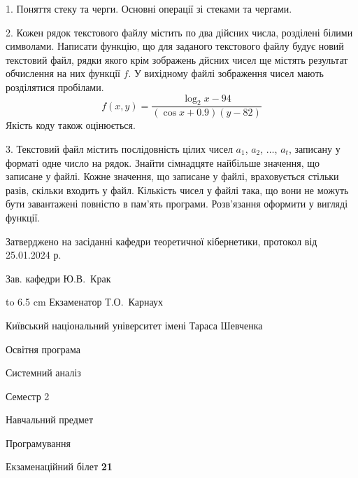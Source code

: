 \documentclass[12pt, ukrainian]{article}
\begin{document}
{%
1. Поняття стеку та черги. Основні операції зі стеками та чергами.%
\par
\vspace{2mm}

2. Кожен рядок текстового файлу містить по два дійсних числа, розділені білими символами.
Написати функцію, що для заданого текстового файлу будує новий текстовий файл, рядки якого крім зображень дйсних чисел ще містять результат обчислення на них функції $f$. У вихідному файлі зображення чисел мають розділятися пробілами. 
$$f(x, y) =\frac{\log_{2} x - 94}{(\cos x + 0.9) (y - 82)}$$ 
Якість коду також оцінюється.

\par
\vspace{2mm}

3. Текстовий файл містить послідовність цілих чисел $a_1$, $a_2$, $\ldots$, $a_t$, записану у форматі одне число на рядок. Знайти сімнадцяте найбільше значення, що записане у файлі. Кожне значення, що записане у файлі, враховується стільки разів, скільки входить у файл. Кількість чисел у файлі така, що вони не можуть бути завантажені повністю в пам'ять програми. Розв'язання оформити у вигляді функції.

}
{\smallskip\smallskip \begin {scriptsize} Затверджено на засіданні кафедри теоретичної кібернетики, протокол   від   25.01.2024 р.\par\smallskip\smallskip\smallskip\smallskip
{\parbox {6.5 cm} {Зав. кафедри \dotfill Ю.В.~Крак}}\hspace {0.7cm} {\hbox to 6.5 cm { Екзаменатор \dotfill Т.О.~Карнаух}} \end{scriptsize}}
\newpage
{{\begin {scriptsize}\par
{ \center  Київський національний університет імені Тараса Шевченка \par}
{\parbox {5 cm}{Освітня програма \hfill}{\parbox {7 cm}{Системний аналіз\hfill}}\parbox {6 cm}{\hfill Семестр 2}}\par
{\parbox {5 cm} {Навчальний предмет \hfill}\parbox {7 cm}{Програмування \hfill}\parbox {6cm}{\hfill}\par}\vspace{-15pt} \end{scriptsize}}{\center Екзаменаційний білет \No \textbf { 21 }\par}}
\end{document}
